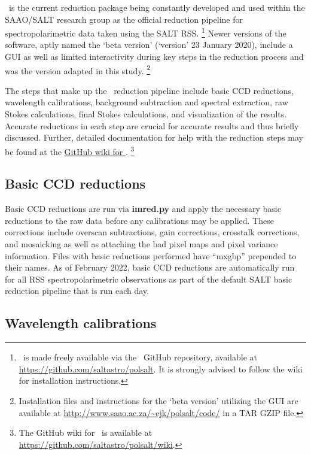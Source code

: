 \polsalt\ is the current reduction package being constantly developed and used within the \gls{SAAO}/\gls{SALT} research group as the official reduction pipeline for spectropolarimetric data taken using the \gls{SALT} \gls{RSS}.%
\footnote{\polsalt\ is made freely available via the \polsalt\ GitHub repository, available at \url{https://github.com/saltastro/polsalt}. It is strongly advised to follow the wiki for installation instructions.}
Newer versions of the software, aptly named the `beta version' (`version' 23 January 2020), include a \gls{GUI} as well as limited interactivity during key steps in the reduction process and was the version adapted in this study.%
\footnote{Installation files and instructions for the `beta version' utilizing the \gls{GUI} are available at \url{http://www.saao.ac.za/~ejk/polsalt/code/} in a TAR GZIP file.}

The steps that make up the \polsalt\ reduction pipeline include basic \gls{CCD} reductions, wavelength calibrations, background subtraction and spectral extraction, raw Stokes calculations, final Stokes calculations, and visualization of the results. Accurate reductions in each step are crucial for accurate results and thus briefly discussed. Further, detailed documentation for help with the reduction steps may be found at the \href{https://github.com/saltastro/polsalt/wiki}{GitHub wiki for \polsalt}.%
\footnote{The GitHub wiki for \polsalt\ is available at \url{https://github.com/saltastro/polsalt/wiki}.}

\subsection{Basic CCD reductions}

Basic \gls{CCD} reductions are run via \textbf{imred.py} and apply the necessary basic reductions to the raw data before any calibrations may be applied. These corrections include overscan subtractions, gain corrections, crosstalk corrections, and mosaicking as well as attaching the bad pixel maps and pixel variance information. Files with basic reductions performed have ``mxgbp'' prepended to their names. As of February 2022, basic \gls{CCD} reductions are automatically run for all RSS spectropolarimetric observations as part of the default SALT basic reduction pipeline that is run each day.

\subsection{Wavelength calibrations}

